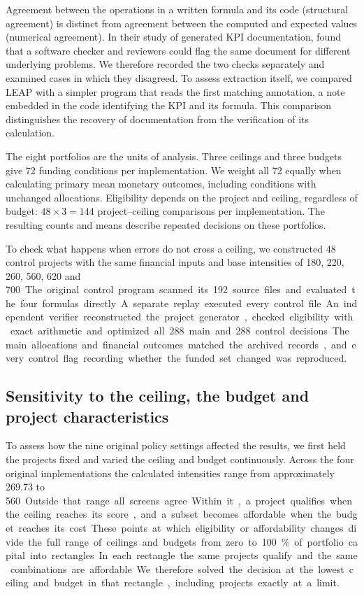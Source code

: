Agreement between the operations in a written formula and its code (structural agreement) is distinct from agreement between the computed and expected values (numerical agreement). In their study of generated KPI documentation, \citet{checks} found that a software checker and reviewers could flag the same document for different underlying problems. We therefore recorded the two checks separately and examined cases in which they disagreed. To assess extraction itself, we compared LEAP with a simpler program that reads the first matching annotation, a note embedded in the code identifying the KPI and its formula. This comparison distinguishes the recovery of documentation from the verification of its calculation.

The eight portfolios are the units of analysis. Three ceilings and three budgets give 72 funding conditions per implementation. We weight all 72 equally when calculating primary mean monetary outcomes, including conditions with unchanged allocations. Eligibility depends on the project and ceiling, regardless of budget: $48\times3=144$ project--ceiling comparisons per implementation. The resulting counts and means describe repeated decisions on these portfolios.

To check what happens when errors do not cross a ceiling, we constructed 48 control projects with the same financial inputs and base intensities of 180, 220, 260, 560, 620 and 700~\unit. The original control program scanned its 192 source files and evaluated the four formulas directly. A separate replay executed every control file. An independent verifier reconstructed the project generator, checked eligibility with exact arithmetic and optimized all 288 main and 288 control decisions. The main allocations and financial outcomes matched the archived records, and every control flag recording whether the funded set changed was reproduced.

\subsection{Sensitivity to the ceiling, the budget and project characteristics}
To assess how the nine original policy settings affected the results, we first held the projects fixed and varied the ceiling and budget continuously. Across the four original implementations the calculated intensities range from approximately 269.73 to 560~\unit. Outside that range all screens agree. Within it, a project qualifies when the ceiling reaches its score, and a subset becomes affordable when the budget reaches its cost. These points at which eligibility or affordability changes divide the full range of ceilings and budgets from zero to 100\% of portfolio capital into rectangles. In each rectangle the same projects qualify and the same combinations are affordable. We therefore solved the decision at the lowest ceiling and budget in that rectangle, including projects exactly at a limit.

